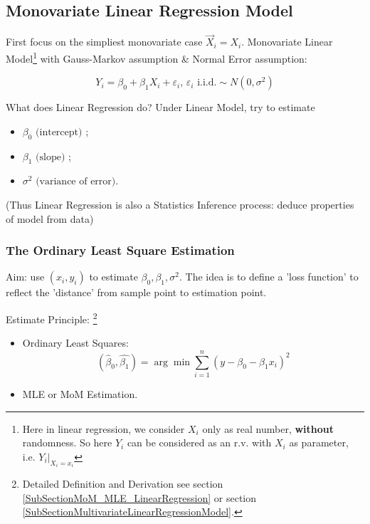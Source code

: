 \subsection{Monovariate Linear Regression Model}
    First focus on the simpliest monovariate case $ \vec{X}_i=X_i $. Monovariate Linear Model\footnote{Here in linear regression, we consider $ X_i $ only as real number, \textbf{without} randomness. So here $ Y_i $ can be considered as an r.v. with $ X_i $ as parameter, i.e. $ Y_i|_{X_i=x_i} $}
    with Gauss-Markov assumption \& Normal Error assumption:
    
    \begin{equation}
        Y_i=\beta _0+\beta _1X_i+\varepsilon _i ,\, \varepsilon _i\text{ i.i.d.}\sim N(0,\sigma ^2) 
    \end{equation}


 
  


    What does Linear Regression do? Under Linear Model, try to estimate 
    \begin{itemize}[topsep=0pt,itemsep=-2pt]
        \item $ \beta _0\text{ (intercept) }$;
        \item $\beta _1\text{ (slope) }$;
        \item $\sigma ^2\text{ (variance of error)} $.
    \end{itemize}
    
    
    (Thus Linear Regression is also a Statistics Inference process: deduce properties of model from data)
        
\subsubsection{The Ordinary Least Square Estimation}
    Aim: use $ (x_i,y_i) $  to estimate $ \beta _0,\beta _1,\sigma^2 $. The idea is to define a 'loss function' to reflect the 'distance' from sample point to estimation point.

    Estimate Principle: \footnote{Detailed Definition and Derivation see section \ref{SubSectionMoM_MLE_LinearRegression} or section \ref{SubSectionMultivariateLinearRegressionModel}.}
    \begin{itemize}[topsep=2pt,itemsep=2pt]
        \item Ordinary Least Squares:
        \begin{equation}
            (\hat{\beta  }_0,\hat{\beta _1})=\arg\min\sum_{i=1}^n (y-\beta _0-\beta _1x_i)^2
        \end{equation}
        \item MLE or MoM Estimation.
    \end{itemize}
    

